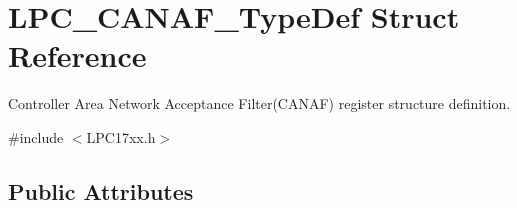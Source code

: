 \hypertarget{struct_l_p_c___c_a_n_a_f___type_def}{\section{\-L\-P\-C\-\_\-\-C\-A\-N\-A\-F\-\_\-\-Type\-Def \-Struct \-Reference}
\label{struct_l_p_c___c_a_n_a_f___type_def}
}


\-Controller \-Area \-Network \-Acceptance \-Filter(\-C\-A\-N\-A\-F) register structure definition.  




{\ttfamily \#include $<$\-L\-P\-C17xx.\-h$>$}

\subsection*{\-Public \-Attributes}
